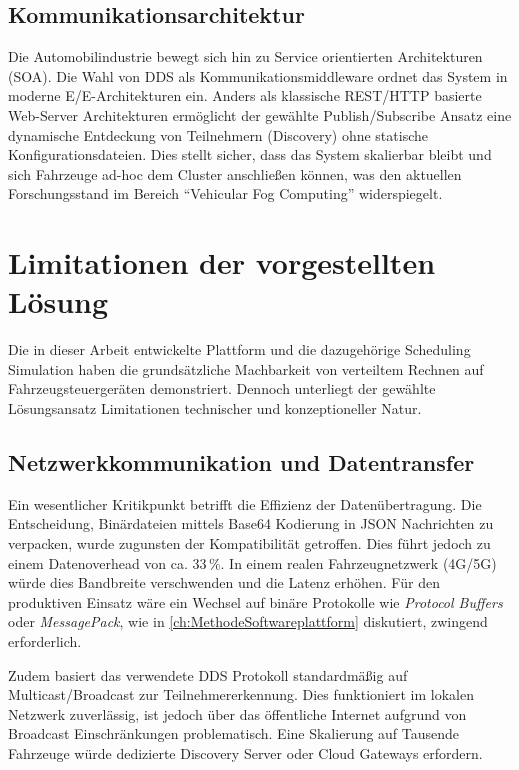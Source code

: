 \subsection{Kommunikationsarchitektur}
Die Automobilindustrie bewegt sich hin zu Service orientierten Architekturen (SOA). Die Wahl von \gls{DDS} als Kommunikationsmiddleware ordnet das System in moderne E/E-Architekturen ein. Anders als klassische REST/HTTP basierte Web-Server Architekturen ermöglicht der gewählte Publish/Subscribe Ansatz eine dynamische Entdeckung von Teilnehmern (Discovery) ohne statische Konfigurationsdateien. Dies stellt sicher, dass das System skalierbar bleibt und sich Fahrzeuge ad-hoc dem Cluster anschließen können, was den aktuellen Forschungsstand im Bereich \enquote{Vehicular Fog Computing} widerspiegelt.

\section{Limitationen der vorgestellten Lösung}
\label{sec:Limitationen}

Die in dieser Arbeit entwickelte Plattform und die dazugehörige Scheduling Simulation haben die grundsätzliche Machbarkeit von verteiltem Rechnen auf Fahrzeugsteuergeräten demonstriert. Dennoch unterliegt der gewählte Lösungsansatz Limitationen technischer und konzeptioneller Natur.

\subsection{Netzwerkkommunikation und Datentransfer}
Ein wesentlicher Kritikpunkt betrifft die Effizienz der Datenübertragung. Die Entscheidung, Binärdateien mittels Base64 Kodierung in JSON Nachrichten zu verpacken, wurde zugunsten der Kompatibilität getroffen. Dies führt jedoch zu einem Datenoverhead von ca. 33\,\%. In einem realen Fahrzeugnetzwerk (4G/5G) würde dies Bandbreite verschwenden und die Latenz erhöhen. Für den produktiven Einsatz wäre ein Wechsel auf binäre Protokolle wie \textit{Protocol Buffers} oder \textit{MessagePack}, wie in \autoref{ch:MethodeSoftwareplattform} diskutiert, zwingend erforderlich.

Zudem basiert das verwendete \gls{DDS} Protokoll standardmäßig auf Multicast/Broadcast zur Teilnehmererkennung. Dies funktioniert im lokalen Netzwerk zuverlässig, ist jedoch über das öffentliche Internet aufgrund von Broadcast Einschränkungen problematisch. Eine Skalierung auf Tausende Fahrzeuge würde dedizierte Discovery Server oder Cloud Gateways erfordern.

